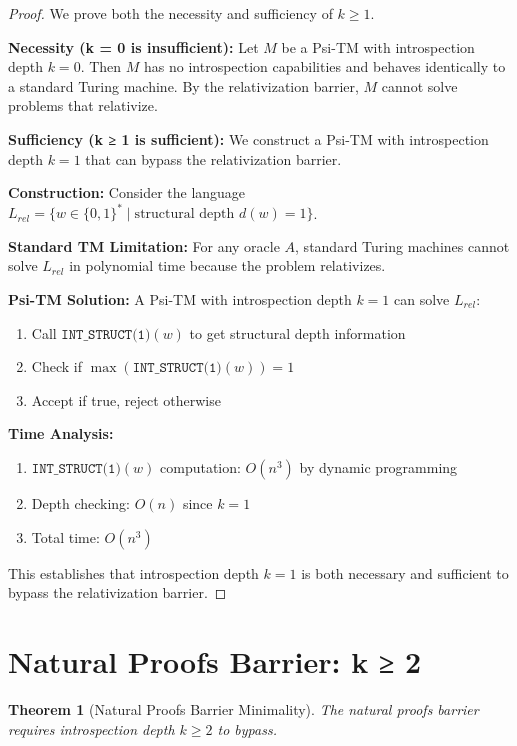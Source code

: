 \documentclass[11pt]{article}
\newtheorem{theorem}{Theorem}
\begin{document}
\begin{proof}
We prove both the necessity and sufficiency of $k \geq 1$.

\textbf{Necessity (k = 0 is insufficient):}
Let $M$ be a Psi-TM with introspection depth $k = 0$. Then $M$ has no introspection capabilities and behaves identically to a standard Turing machine. By the relativization barrier, $M$ cannot solve problems that relativize.

\textbf{Sufficiency (k ≥ 1 is sufficient):}
We construct a Psi-TM with introspection depth $k = 1$ that can bypass the relativization barrier.

\textbf{Construction:}
Consider the language $L_{rel} = \{w \in \{0,1\}^* \mid \text{structural depth } d(w) = 1\}$.

\textbf{Standard TM Limitation:}
For any oracle $A$, standard Turing machines cannot solve $L_{rel}$ in polynomial time because the problem relativizes.

\textbf{Psi-TM Solution:}
A Psi-TM with introspection depth $k = 1$ can solve $L_{rel}$:
\begin{enumerate}
\item Call $\texttt{INT\_STRUCT(1)}(w)$ to get structural depth information
\item Check if $\max(\texttt{INT\_STRUCT(1)}(w)) = 1$
\item Accept if true, reject otherwise
\end{enumerate}

\textbf{Time Analysis:}
\begin{enumerate}
\item $\texttt{INT\_STRUCT(1)}(w)$ computation: $O(n^3)$ by dynamic programming
\item Depth checking: $O(n)$ since $k = 1$
\item Total time: $O(n^3)$
\end{enumerate}

This establishes that introspection depth $k = 1$ is both necessary and sufficient to bypass the relativization barrier.
\end{proof}

\section{Natural Proofs Barrier: k ≥ 2}

\begin{theorem}[Natural Proofs Barrier Minimality]
The natural proofs barrier requires introspection depth $k \geq 2$ to bypass.
\end{theorem}
\end{document}
